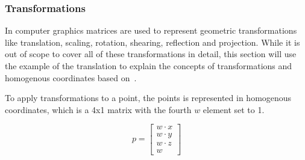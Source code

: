 
\subsubsection{Transformations}

In computer graphics matrices are used to represent geometric transformations like translation, scaling, rotation,
shearing, reflection and projection.
While it is out of scope to cover all of these transformations in detail,
this section will use the example of the translation to explain the concepts of
transformations and homogenous coordinates based on~\cite{dorner_virtual_2019}.



To apply transformations to a point, the points is represented in homogenous coordinates,
which is a 4x1 matrix with the fourth $w$ element set to 1.

\begin{equation}
    p = \begin{bmatrix}
            w \cdot x \\
            w \cdot y \\
            w \cdot z \\
            w
    \end{bmatrix}
\end{equation}

